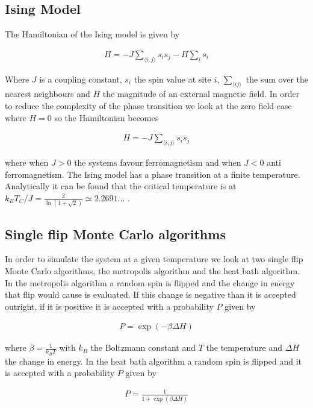 \documentclass[10 pt, a4paper]{article}
\begin{document}
\subsection{Ising Model}

The Hamiltonian of the Ising model is given by

\begin{align*}
H = - J \sum_{\langle i,j\rangle} s_i s_j - H \sum_i s_i
\end{align*}

Where $J$ is a coupling constant, $s_i$ the spin value at site $i$, $\sum_{\langle ij\rangle}$ the sum over the nearest neighbours and $H$ the magnitude of an external magnetic field. In order to reduce the complexity of the phase transition we look at the zero field case where $H = 0$ so the Hamiltonian becomes

\begin{align*}
H = - J \sum_{\langle i,j\rangle} s_i s_j 
\end{align*}

where when $J > 0$ the systems favour ferromagnetism and when $J < 0$ anti ferromagnetism. The Ising model has a phase transition at a finite temperature. Analytically it can be found that the critical temperature is at $k_B T_C / J = \frac{2}{\ln(1 + \sqrt{2})} \simeq 2.2691 \dots $ \cite{onsager}.

\subsection{Single flip Monte Carlo algorithms}

In order to simulate the system at a given temperature we look at two single flip Monte Carlo algorithms, the metropolis algorithm and the heat bath algorithm. In the metropolis algorithm a random spin is flipped and the change in energy that flip would cause is evaluated. If this change is negative than it is accepted outright, if it is positive it is accepted with a probability $P$ given by

\begin{align} \label{metropolis}
P = \exp(-\beta \Delta H)
\end{align}

where $\beta = \frac{1}{k_B T}$ with $k_B$ the Boltzmann constant and $T$ the temperature and $\Delta H$ the change in energy. In the heat bath algorithm a random spin is flipped and it is accepted with a probability $P$ given by

\begin{align}
P = \frac{1}{1 + \exp(\beta \Delta H)}
\end{align} 
\end{document}
